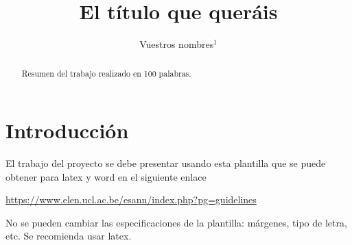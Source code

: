 \documentclass{esannV2}
\begin{document}
\title{El título que queráis}

\author{Vuestros nombres$^1$
%
%
\vspace{.3cm}\\
%
%
}

\maketitle

\begin{abstract}
Resumen del trabajo realizado en 100 palabras.
\end{abstract}

\section{Introducción}
El trabajo del proyecto se debe presentar usando esta plantilla que se puede
obtener para latex y word en el siguiente enlace

\begin{center}
\href{https://www.elen.ucl.ac.be/esann/index.php?pg=guidelines}{https://www.elen.ucl.ac.be/esann/index.php?pg=guidelines}
\end{center}
 
No se pueden cambiar las especificaciones de la plantilla: márgenes, tipo de
letra, etc. Se recomienda usar latex.
\end{document}
